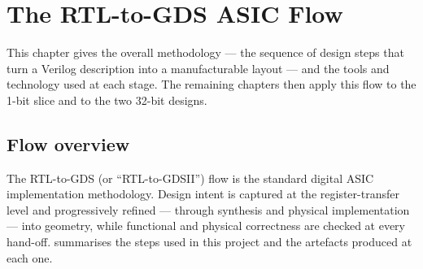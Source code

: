 \chapter{The RTL-to-GDS ASIC Flow}
\label{ch:flow}

This chapter gives the overall methodology --- the sequence of design
steps that turn a Verilog description into a manufacturable layout --- and
the tools and technology used at each stage. The remaining chapters then
apply this flow to the 1-bit slice and to the two 32-bit designs.

\section{Flow overview}
The RTL-to-GDS (or ``RTL-to-GDSII'') flow is the standard digital ASIC
implementation methodology. Design intent is captured at the
register-transfer level and progressively refined --- through synthesis
and physical implementation --- into geometry, while functional and
physical correctness are checked at every hand-off. 
summarises the steps used in this project and the artefacts produced at
each one.

